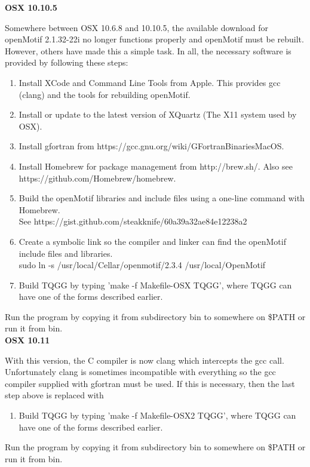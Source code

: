 \documentclass{article}
\begin{document}
{\bf{OSX 10.10.5}}

Somewhere between OSX 10.6.8 and 10.10.5, the available download for openMotif 2.1.32-22i no longer 
functions properly and openMotif must be rebuilt. However, others have made this a simple task.
In all, the necessary software is provided by following these steps:
\begin{enumerate}
 \item Install XCode and Command Line Tools from Apple. This provides gcc (clang) and the tools
 for rebuilding openMotif.
 \item Install or update to the latest version of XQuartz (The X11 system used by OSX). 
 \item Install gfortran from https://gcc.gnu.org/wiki/GFortranBinariesMacOS.
 \item Install Homebrew for package management from http://brew.sh/. Also see https://github.com/Homebrew/homebrew.
 \item Build the openMotif libraries and include files using a one-line command with Homebrew.\\ 
 See https://gist.github.com/steakknife/60a39a32ae84e12238a2
 \item Create a symbolic link so the compiler and linker can find the openMotif include files and libraries.\\
 sudo ln -s /usr/local/Cellar/openmotif/2.3.4 /usr/local/OpenMotif
 \item Build TQGG by typing 'make -f Makefile-OSX TQGG', where TQGG can have one of the forms described earlier.
\end{enumerate}

Run the program by copying it from subdirectory bin to somewhere on \$PATH or run it from bin. \\ 

{\bf{OSX 10.11}}

With this version, the C compiler is now clang which intercepts the gcc call. Unfortunately clang is sometimes
incompatible with everything so the gcc compiler supplied with gfortran must be used. If this is necessary,
then the last step above is replaced with

\begin{enumerate}
 \item Build TQGG by typing 'make -f Makefile-OSX2 TQGG', where TQGG can have one of the forms described earlier.
\end{enumerate}

Run the program by copying it from subdirectory bin to somewhere on \$PATH or run it from bin. 
\end{document}
